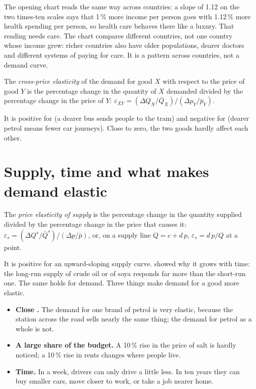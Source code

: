 The opening chart reads the same way across countries: a slope of 1.12 on the two times-ten scales says that 1\,\% more income per person goes
with 1.12\,\% more health spending per person, so health care behaves there like a luxury. That reading needs care. The chart compares
different countries, not one country whose income grew: richer countries also have older populations, dearer doctors and different
systems of paying for care. It is a pattern across countries, not a demand curve.

\begin{definition}\label{def:g10:elasticities:cross-price}
The \emph{cross-price elasticity} of the demand for good $X$ with respect to the price of good $Y$ is the percentage
change in the quantity of $X$ demanded divided by the percentage change in the price of $Y$: $\varepsilon_{XY} = (\Delta Q_X/\bar Q_X)/(\Delta
p_Y/\bar p_Y)$.
\end{definition}

It is positive for  (a dearer bus sends people to the tram) and negative for  (dearer petrol means fewer car journeys).
Close to zero, the two goods hardly affect each other.

\section{Supply, time and what makes demand elastic}\label{sec:g10:elasticities:supply}

\begin{definition}\label{def:g10:elasticities:supply}
The \emph{price elasticity of supply} is the percentage change in the quantity supplied divided by the percentage
change in the price that causes it: $\varepsilon_s = (\Delta Q^s/\bar Q^s)/(\Delta p/\bar p)$, or, on a supply line $Q = c + d\,p$, $\varepsilon_s =
d\,p/Q$ at a point.
\end{definition}

It is positive for an upward-sloping supply curve.  showed why it grows with time: the long-run supply of crude oil or of soya
responds far more than the short-run one. The same holds for demand. Three things make demand for a good more elastic.

\begin{itemize}
\item \textbf{Close .} The demand for one brand of petrol is very elastic, because the station across the road sells nearly the same
  thing; the demand for petrol as a whole is not.
\item \textbf{A large share of the budget.} A 10\,\% rise in the price of salt is hardly noticed; a 10\,\% rise in rents changes where people live.
\item \textbf{Time.} In a week, drivers can only drive a little less. In ten years they can buy smaller cars, move closer to work, or take a job
  nearer home.
\end{itemize}

